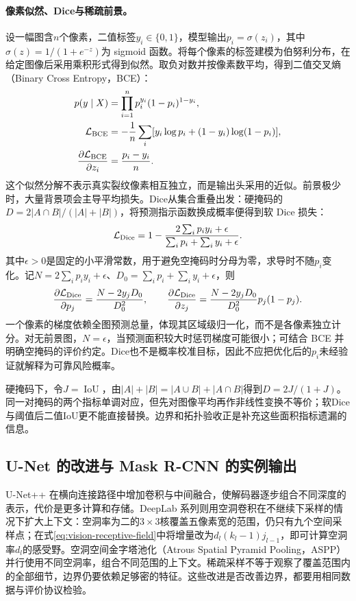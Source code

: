 \paragraph{像素似然、Dice与稀疏前景。}
设一幅图含$n$个像素，二值标签$y_i\in\{0,1\}$，模型输出$p_i=\sigma(z_i)$，其中$\sigma(z)=1/(1+e^{-z})$为 sigmoid 函数。将每个像素的标签建模为伯努利分布，在给定图像后采用乘积形式得到似然。取负对数并按像素数平均，得到二值交叉熵（Binary Cross Entropy，BCE）：
\begin{align}
 p(y\mid X)&=\prod_{i=1}^n p_i^{y_i}(1-p_i)^{1-y_i},\\
 \mathcal L_{\rm BCE}&=-\frac1n\sum_i[y_i\log p_i+(1-y_i)\log(1-p_i)],\\
 \frac{\partial\mathcal L_{\rm BCE}}{\partial z_i}&=\frac{p_i-y_i}{n}.
\end{align}
这个似然分解不表示真实裂纹像素相互独立，而是输出头采用的近似。前景极少时，大量背景项会主导平均损失。Dice从集合重叠出发：硬掩码的$D=2|A\cap B|/(|A|+|B|)$，将预测指示函数换成概率便得到软 Dice 损失：
\begin{equation}
 \mathcal L_{\rm Dice}=1-\frac{2\sum_i p_iy_i+\epsilon}{\sum_i p_i+\sum_i y_i+\epsilon}.
 \label{eq:vision-soft-dice}
\end{equation}
其中$\epsilon>0$是固定的小平滑常数，用于避免空掩码时分母为零，求导时不随$p_i$变化。记$N=2\sum_i p_iy_i+\epsilon$、$D_0=\sum_i p_i+\sum_i y_i+\epsilon$，则
\begin{equation}
 \frac{\partial\mathcal L_{\rm Dice}}{\partial p_j}
 =\frac{N-2y_jD_0}{D_0^2},\qquad
 \frac{\partial\mathcal L_{\rm Dice}}{\partial z_j}
 =\frac{N-2y_jD_0}{D_0^2}p_j(1-p_j).
\end{equation}
一个像素的梯度依赖全图预测总量，体现其区域级归一化，而不是各像素独立计分。对无前景图，$N=\epsilon$，当预测面积较大时惩罚梯度可能很小；可结合 BCE 并明确空掩码的评价约定。Dice也不是概率校准目标，因此不应把优化后的$p_i$未经验证就解释为可靠风险概率。

硬掩码下，令$J=\operatorname{IoU}$，由$|A|+|B|=|A\cup B|+|A\cap B|$得到$D=2J/(1+J)$。同一对掩码的两个指标单调对应，但先对图像平均再作非线性变换不等价；软Dice与阈值后二值IoU更不能直接替换。边界和拓扑验收正是补充这些面积指标遗漏的信息。

\subsection{U-Net 的改进与 Mask R-CNN 的实例输出}
U-Net++ 在横向连接路径中增加卷积与中间融合，使解码器逐步组合不同深度的表示，代价是更多计算和存储。DeepLab 系列则用空洞卷积在不继续下采样的情况下扩大上下文：空洞率为二的$3\times3$核覆盖五像素宽的范围，仍只有九个空间采样点；在式\eqref{eq:vision-receptive-field}中将增量改为$d_l(k_l-1)j_{l-1}$，即可计算空洞率$d_l$的感受野。空洞空间金字塔池化（Atrous Spatial Pyramid Pooling，ASPP）并行使用不同空洞率，组合不同范围的上下文。稀疏采样不等于观察了覆盖范围内的全部细节，边界仍要依赖足够密的特征。这些改进是否改善边界，都要用相同数据与评价协议检验。

